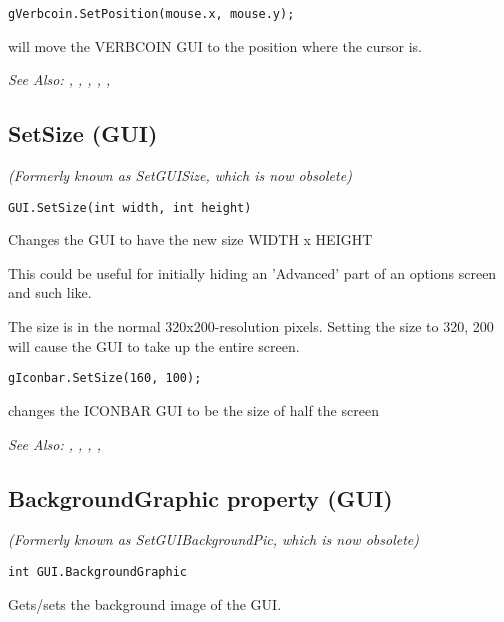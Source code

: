 \begin{verbatim}
gVerbcoin.SetPosition(mouse.x, mouse.y);
\end{verbatim}
will move the VERBCOIN GUI to the position where the cursor is.

\it{See Also:} , ,
, ,
, 



\subsection{SetSize (GUI)}\label{GUI.SetSize}%

\it{(Formerly known as SetGUISize, which is now obsolete)}

\begin{verbatim}
GUI.SetSize(int width, int height)
\end{verbatim}
Changes the GUI to have the new size  WIDTH x HEIGHT

This could be useful for initially hiding an 'Advanced' part of an options screen
and such like.

The size is in the normal 320x200-resolution pixels. Setting the size to 320, 200 will
cause the GUI to take up the entire screen.

\begin{verbatim}
gIconbar.SetSize(160, 100);
\end{verbatim}
changes the ICONBAR GUI to be the size of half the screen

\it{See Also:} ,
,
,
,



\subsection{BackgroundGraphic property (GUI)}\label{GUI.BackgroundGraphic}%

\it{(Formerly known as SetGUIBackgroundPic, which is now obsolete)}

\begin{verbatim}
int GUI.BackgroundGraphic
\end{verbatim}
Gets/sets the background image of the GUI.


